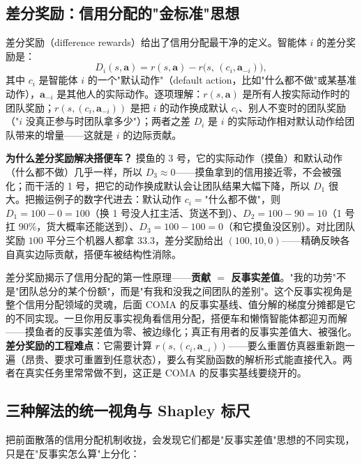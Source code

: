 \subsection{差分奖励：信用分配的"金标准"思想}

差分奖励（difference rewards）\cite{wolpert2002difference}给出了信用分配最干净的定义。智能体 $i$ 的差分奖励是：
\begin{equation}
  D_i(s,\mathbf{a})=r(s,\mathbf{a})-r\big(s,\,(c_i,\mathbf{a}_{-i})\big),
  \label{eq:sm-diff-reward}
\end{equation}
其中 $c_i$ 是智能体 $i$ 的一个"默认动作"（default action，比如"什么都不做"或某基准动作），$\mathbf{a}_{-i}$ 是其他人的实际动作。逐项理解：$r(s,\mathbf{a})$ 是所有人按实际动作时的团队奖励；$r(s,(c_i,\mathbf{a}_{-i}))$ 是把 $i$ 的动作换成默认 $c_i$、别人不变时的团队奖励（"$i$ 没真正参与时团队拿多少"）；两者之差 $D_i$ 是 $i$ 的实际动作相对默认动作给团队带来的增量——这就是 $i$ 的边际贡献。

\textbf{为什么差分奖励解决搭便车？} 摸鱼的 3 号，它的实际动作（摸鱼）和默认动作（什么都不做）几乎一样，所以 $D_3\approx0$——摸鱼拿到的信用接近零，不会被强化；而干活的 1 号，把它的动作换成默认会让团队结果大幅下降，所以 $D_1$ 很大。把搬运例子的数字代进去：默认动作 $c_i=$"什么都不做"，则 $D_1=100-0=100$（换 1 号没人扛主活、货送不到）、$D_2=100-90=10$（1 号扛 90\%，货大概率还能送到）、$D_3=100-100=0$（和它摸鱼没区别）。对比团队奖励 $100$ 平分三个机器人都拿 $33.3$，差分奖励给出 $(100,10,0)$——精确反映各自真实边际贡献，搭便车被结构性消除。

\begin{insight}
差分奖励揭示了信用分配的第一性原理——\textbf{贡献 $=$ 反事实差值}。"我的功劳"不是"团队总分的某个份额"，而是"有我和没我之间团队的差别"。这个反事实视角是整个信用分配领域的灵魂，后面 COMA 的反事实基线、值分解的梯度分摊都是它的不同实现。一旦你用反事实视角看信用分配，搭便车和懒惰智能体都迎刃而解——摸鱼者的反事实差值为零、被边缘化；真正有用者的反事实差值大、被强化。\textbf{差分奖励的工程难点}：它需要计算 $r(s,(c_i,\mathbf{a}_{-i}))$——要么重置仿真器重新跑一遍（昂贵、要求可重置到任意状态），要么有奖励函数的解析形式能直接代入。两者在真实任务里常常做不到，这正是 COMA 的反事实基线要绕开的。
\end{insight}

\subsection{三种解法的统一视角与 Shapley 标尺}

把前面散落的信用分配机制收拢，会发现它们都是"反事实差值"思想的不同实现，只是在"反事实怎么算"上分化：

